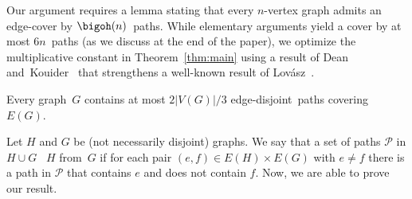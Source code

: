 Our argument requires a lemma stating that every $n$-vertex graph admits an edge-cover
by $\bigoh(n)$~paths.
  While elementary arguments yield a cover by at most \(6n\)~paths
  (as we discuss at the end of the paper),
  we optimize the multiplicative constant in Theorem~\ref{thm:main}
  using a result of Dean and~Kouider~\cite{dean2000gallai}
  that strengthens a well-known result of Lovász~\cite{lovasz1968covering}.

\begin{theorem}\label{thm:dean-kouider}
  Every graph~$G$ contains at most \(2|V(G)|/3\) edge-disjoint~paths covering~$E(G)$.
\end{theorem}

Let \(H\) and \(G\) be (not necessarily disjoint) graphs.
We say that a set of paths \(\mathcal{P}\) in \(H \cup G\) ~\(H\) from~\(G\)
if for each pair \((e,f) \in E(H) \times E(G)\) with \(e \ne f\)
there is a path in \(\mathcal{P}\) that contains \(e\) and does not contain \(f\).
Now, we are able to prove our result.

